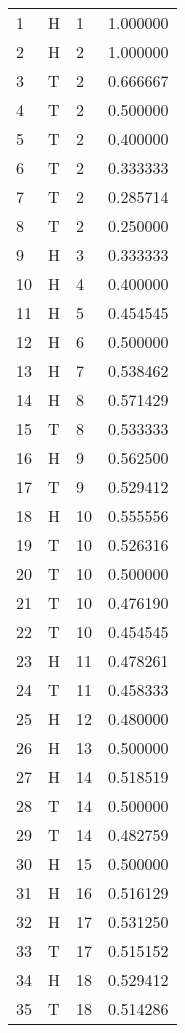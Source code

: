 \documentclass[utf8]{article}
\begin{document}
\begin{longtable}{|l|l|l|l|}
        1 & H & 1 & 1.000000 \\
        2 & H & 2 & 1.000000 \\
        3 & T & 2 & 0.666667 \\
        4 & T & 2 & 0.500000 \\
        5 & T & 2 & 0.400000 \\
        6 & T & 2 & 0.333333 \\
        7 & T & 2 & 0.285714 \\
        8 & T & 2 & 0.250000 \\
        9 & H & 3 & 0.333333 \\
        10 & H & 4 & 0.400000 \\
        11 & H & 5 & 0.454545 \\
        12 & H & 6 & 0.500000 \\
        13 & H & 7 & 0.538462 \\
        14 & H & 8 & 0.571429 \\
        15 & T & 8 & 0.533333 \\
        16 & H & 9 & 0.562500 \\
        17 & T & 9 & 0.529412 \\
        18 & H & 10 & 0.555556 \\
        19 & T & 10 & 0.526316 \\
        20 & T & 10 & 0.500000 \\
        21 & T & 10 & 0.476190 \\
        22 & T & 10 & 0.454545 \\
        23 & H & 11 & 0.478261 \\
        24 & T & 11 & 0.458333 \\
        25 & H & 12 & 0.480000 \\
        26 & H & 13 & 0.500000 \\
        27 & H & 14 & 0.518519 \\
        28 & T & 14 & 0.500000 \\
        29 & T & 14 & 0.482759 \\
        30 & H & 15 & 0.500000 \\
        31 & H & 16 & 0.516129 \\
        32 & H & 17 & 0.531250 \\
        33 & T & 17 & 0.515152 \\
        34 & H & 18 & 0.529412 \\
        35 & T & 18 & 0.514286 \\

\end{longtable}
\end{document}
